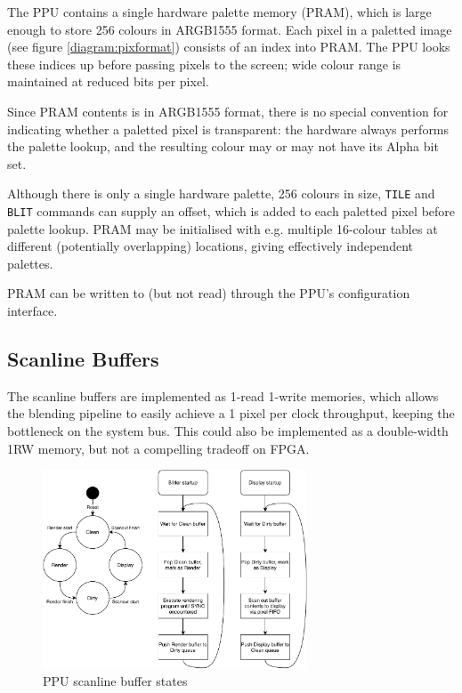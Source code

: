 The PPU contains a single hardware palette memory (PRAM), which is large enough to store 256 colours in ARGB1555 format. Each pixel in a paletted image (see figure \ref{diagram:pixformat}) consists of an index into PRAM. The PPU looks these indices up before passing pixels to the screen; wide colour range is maintained at reduced bits per pixel.

Since PRAM contents is in ARGB1555 format, there is no special convention for indicating whether a paletted pixel is transparent: the hardware always performs the palette lookup, and the resulting colour may or may not have its Alpha bit set.

Although there is only a single hardware palette, 256 colours in size, {\tt TILE} and {\tt BLIT} commands can supply an offset, which is added to each paletted pixel before palette lookup. PRAM may be initialised with e.g. multiple 16-colour tables at different (potentially overlapping) locations, giving effectively independent palettes.

PRAM can be written to (but not read) through the PPU's configuration interface.

\subsection{Scanline Buffers}


The scanline buffers are implemented as 1-read 1-write memories, which allows the blending pipeline to easily achieve a 1 pixel per clock throughput, keeping the bottleneck on the system bus. This could also be implemented as a double-width 1RW memory, but not a compelling tradeoff on FPGA.

\begin{figure}[H]
\centering
\caption{PPU scanline buffer states}
\label{diagram:ppu_buffer_states}
\includegraphics[width=0.7\textwidth]{diagrams/ppu_buffer_states.pdf}
\end{figure}

